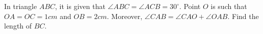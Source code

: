 In triangle $ABC$, it is given that $\angle ABC=\angle ACB=30^{\circ}$. Point $O$ is such that $OA=OC=1cm$ and $OB=2cm$. Moreover, $\angle CAB=\angle CAO+\angle OAB$. Find the length of $BC$.
